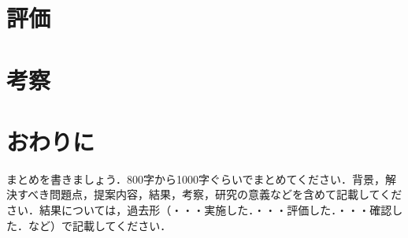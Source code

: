 \documentclass[a4paper,11pt,uplatex]{ujreport}
\begin{document}





\chapter{評価}
\label{chap:評価}


\chapter{考察}
\label{chap:考察}

\chapter{おわりに}
\label{chap:おわりに}

まとめを書きましょう．800字から1000字ぐらいでまとめてください．背景，解決すべき問題点，提案内容，結果，考察，研究の意義などを含めて記載してください．結果については，過去形（・・・実施した．・・・評価した．・・・確認した．など）で記載してください．\par

\end{document}
